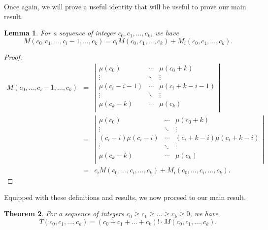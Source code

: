 \documentclass[12pt]{amsart}
\newtheorem{theorem}{Theorem}[section]
\newtheorem{lemma}[theorem]{Lemma}
\newcommand{\ifact}{\mu}
\newcommand{\M}{M}
\begin{document}
Once again, we will prove a useful identity that will be useful to prove our main result.

\begin{lemma}
For a sequence of integer $c_0, c_1, \dots, c_k$, we have
$$
\M(c_0, c_1, \dots, c_i - 1, \dots, c_k) = c_i \M(c_0, c_1, \dots, c_k) + \M_i(c_0, c_1, \dots, c_k).
$$
\label{lem:mimidentity}
\end{lemma}

\begin{proof}
$$\begin{array}{ccl}
 \M(c_0, \dots, c_i - 1, \dots, c_k) & = & \left|
\begin{matrix}
\ifact(c_0) & \cdots & \ifact(c_0+k) \\
\vdots & \ddots & \vdots \\
\ifact(c_i-i-1) & \cdots & \ifact(c_i+k-i-1) \\
\vdots & \ddots & \vdots \\
\ifact(c_k-k) & \cdots & \ifact(c_k) \\
\end{matrix} \right| \\
& = & \left|
\begin{matrix}
\ifact(c_0) & \cdots & \ifact(c_0+k) \\
\vdots & \ddots & \vdots \\
(c_i - i) \ifact(c_i-i) & \cdots & (c_i+k-i) \ifact(c_i+k-i) \\
\vdots & \ddots & \vdots \\
\ifact(c_k-k) & \cdots & \ifact(c_k) \\
\end{matrix} \right| \\
& = & c_i \M(c_0, \dots, c_i, \dots, c_k) + \M_i(c_0, \dots, c_i, \dots, c_k).
\end{array}$$
\end{proof}

\vspace{0.75cm}



Equipped with these definitions and results, we now proceed to our main result.

\begin{theorem}
For a sequence of integers $c_0 \geq c_1 \geq \dots \geq c_k \geq 0$, we have
$$
T(c_0, c_1, \dots, c_k) = (c_0 + c_1 + \dots + c_k)! \cdot \M(c_0, c_1, \dots, c_k).
$$
\label{thm:closedform}
\end{theorem}
\end{document}

